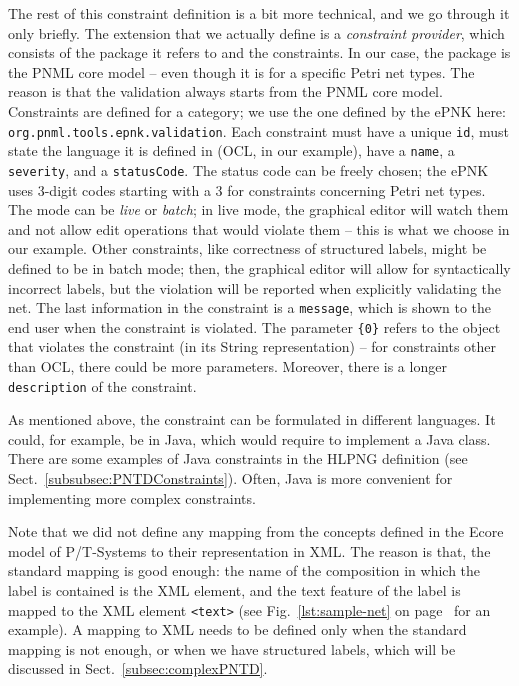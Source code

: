 The rest of this constraint definition is a bit more technical, and we
go through it only briefly. The extension that we actually define is a
\emph{constraint provider},%
which consists of the package it refers to
and the constraints. In our case, the package is the PNML core model --
even though it is for a specific Petri net types. The reason is that
the validation always starts from the PNML core model.
Constraints are defined for a category; we use the one defined by
the ePNK here: {\tt org.pnml.tools.epnk.validation}.
Each constraint must have a unique {\tt id}, must state the language it is
defined in (OCL, in our example), have a {\tt name}, a {\tt severity},
and a {\tt statusCode}. The status code can be freely chosen;
the ePNK uses 3-digit codes starting with a 3 for constraints concerning
Petri net types. The mode can be \emph{live}%
or \emph{batch};%
in live mode,  the graphical editor will watch them and not allow edit
operations that would violate them -- this is what we choose in our example.
Other constraints, like correctness of structured labels, might be defined to
be in batch mode; then, the graphical editor will allow for syntactically
incorrect labels, but the violation will be reported when explicitly validating
the net. The last information in the constraint is a {\tt message}, which is
shown to the end user when the constraint is violated. The parameter \verb+{0}+
refers to the object that violates the constraint (in its String representation) --
for constraints other than OCL, there could be more parameters. Moreover,
there is a longer {\tt description} of the constraint.

As mentioned above, the constraint can be formulated in different
languages. It could, for example, be in Java, which would require to implement
a Java class. There are some examples of Java constraints in the HLPNG
definition (see Sect.~\ref{subsubsec:PNTDConstraints}). Often, Java is more
convenient for implementing more complex constraints.

Note that we did not define any mapping from the concepts defined in the
Ecore model of P/T-Systems to their representation in XML. The reason is
that, the standard mapping is good enough: the name of the composition in which
the label is contained is the XML element, and the text feature of the label
is mapped to the XML element \verb+<text>+ (see Fig.~\ref{lst:sample-net} on
page~\pageref{lst:sample-net} for an example). A mapping to XML needs to be
defined only when the standard mapping is not enough, or when we have
structured labels, which will be discussed in Sect.~\ref{subsec:complexPNTD}.%


